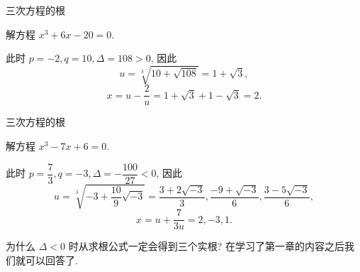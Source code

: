 \begin{frame}{三次方程的根}
\begin{example}
解方程 $x^3+6x-20=0$.
\end{example}
\begin{solution}
此时 $p=-2,q=10,\Delta=108>0$,
\onslide<+->
因此
\[u=\sqrt[3]{10+\sqrt{108}}=1+\sqrt 3,\]
\vspace{-\baselineskip}
\onslide<+->
\[x=u-\frac 2u=1+\sqrt 3+1-\sqrt 3=2.\]
\end{solution}
\end{frame}


\begin{frame}{三次方程的根}
\begin{example}
解方程 $x^3-7x+6=0$.
\end{example}
\begin{solution}
此时 $p=\dfrac73,q=-3,\Delta=-\dfrac{100}{27}<0$,
\onslide<+->
因此
\[u=\sqrt[3]{-3+\frac{10}9\sqrt{-3}}
=\frac{3+2\sqrt{-3}}3,\frac{-9+\sqrt{-3}}6,\frac{3-5\sqrt{-3}}6,\]
\vspace{-\baselineskip}
\onslide<+->
\[x=u+\frac 7{3u}=2,-3,1.\]
\end{solution}

\onslide<+->
为什么 $\Delta<0$ 时从求根公式一定会得到三个实根?
\onslide<+->
在学习了第一章的内容之后我们就可以回答了.
\end{frame}


